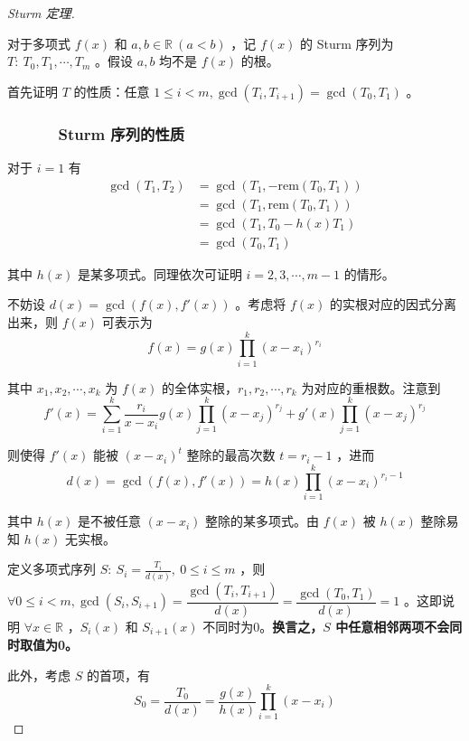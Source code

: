 	\begin{proof}[Sturm 定理]~
		
		对于多项式 $f(x)$ 和 $a, b \in \mathbb{R} \ (a < b)$ ，记 $f(x)$ 的 Sturm 序列为 $T: \ T_0, T_1, \cdots, T_m$ 。假设 $a, b$ 均不是 $f(x)$ 的根。
		
		首先证明 $T$ 的性质：任意 $1\le i < m, \gcd(T_i, T_{i + 1}) = \gcd(T_0, T_1)$ 。
			
		\subsubsection*{\ \ \ \ \ \ Sturm 序列的性质}
			
			对于 $i = 1$ 有
			$$
			\begin{aligned}
			\gcd(T_1, T_2) & = \gcd(T_1, -\textrm{rem}(T_0, T_1)) \\
						   & = \gcd(T_1, \textrm{rem}(T_0, T_1)) \\
						   & = \gcd(T_1, T_0 - h(x)T_1) \\
						   & = \gcd(T_0, T_1) 
			\end{aligned}
			$$
			
			其中 $h(x)$ 是某多项式。同理依次可证明 $i = 2, 3, \cdots, m - 1$ 的情形。
		
		不妨设 $d(x) = \gcd(f(x), f'(x))$ 。考虑将 $f(x)$ 的实根对应的因式分离出来，则 $f(x)$ 可表示为
		$$
		f(x) = g(x)\prod_{i = 1}^k (x - x_i)^{r_i}
		$$
		
		其中 $x_1, x_2, \cdots, x_k$ 为 $f(x)$ 的全体实根，$r_1, r_2, \cdots, r_k$ 为对应的重根数。注意到
		$$
		f'(x) = \sum_{i = 1}^k \frac{r_i}{x - x_i} g(x)\prod_{j = 1}^k (x - x_j)^{r_j} + g'(x)\prod_{j = 1}^k (x - x_j)^{r_j}
		$$
		
		则使得 $f'(x)$ 能被 $(x - x_i)^t$ 整除的最高次数 $t = r_i - 1$ ，进而 
		$$
		d(x) = \gcd(f(x), f'(x)) = h(x)\prod_{i = 1}^k (x - x_i)^{r_i - 1}
		$$
		
		其中 $h(x)$ 是不被任意 $(x - x_i)$ 整除的某多项式。由 $f(x)$ 被 $h(x)$ 整除易知 $h(x)$ 无实根。
		
		定义多项式序列 $S: \ S_i = \frac{T_i}{d(x)}, \ 0 \le i \le m$ ，则 $\forall 0 \le i < m, \gcd(S_i, S_{i + 1}) = \dfrac{\gcd(T_i, T_{i + 1})}{d(x)} = \dfrac{\gcd(T_0, T_1)}{d(x)} = 1$ 。这即说明 $\forall x \in \mathbb{R}$ ，$S_i(x)$ 和 $S_{i + 1}(x)$ 不同时为0。\textbf{换言之，$S$ 中任意相邻两项不会同时取值为0。}
		
		此外，考虑 $S$ 的首项，有
		$$
		S_0 = \dfrac{T_0}{d(x)} = \frac{g(x)}{h(x)}\prod_{i = 1}^k (x - x_i) 
		$$
		

\end{proof}

